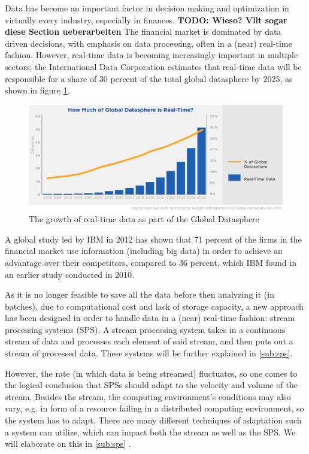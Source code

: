 \quad Data has become an important factor in decision making and optimization in virtually every industry, especially in finances. \textbf{TODO: Wieso? Vllt sogar diese Section ueberarbeiten}
The financial market is dominated by data driven decisions, with emphasis on data processing, often in a (near) real-time fashion.
However, real-time data is becoming increasingly important in multiple sectors; the International Data Corporation estimates that real-time data will be 
responsible for a share of 30 percent of the total global datasphere by 2025, as shown in figure \ref{fig:growth_realtime_data}.
\begin{figure}[ht]
\centering
\includegraphics[width=1.0\textwidth]{Bilder/realtime_data.png}
\caption{The growth of real-time data as part of the Global Datasphere \cite[p. 13]{idc-seagate-data}}
\label{fig:growth_realtime_data}
\end{figure}

\quad A global study led by IBM in 2012 has shown that 71 percent of the firms in the financial market use information (including big data)
in order to achieve an advantage over their competitors, compared to 36 percent, which IBM found in an earlier study conducted in 2010\cite[p. 1]{ibm-financial}.

\quad As it is no longer feasible to save all the data before then analyzing it (in batches), due to computational cost and lack of storage capacity, 
a new approach has been designed in order to handle data in a (near) real-time fashion: stream processing systems (SPS). 
A stream processing system takes in a continuous stream of data and processes each element of said stream, and then puts out a stream of processed data.
These systems will be further explained in \ref{sub:sps}.

\quad However, the rate (in which data is being streamed) fluctuates, so one comes to the logical conclusion that SPSs should adapt to the velocity and volume of the stream.
Besides the stream, the computing environment's conditions may also vary, e.g. in form of a resource failing in a distributed computing environment, 
so the system has to adapt. There are many different techniques of adaptation such a system can utilize, 
which can impact both the stream as well as the SPS. We will elaborate on this in \ref{sub:sps} .

